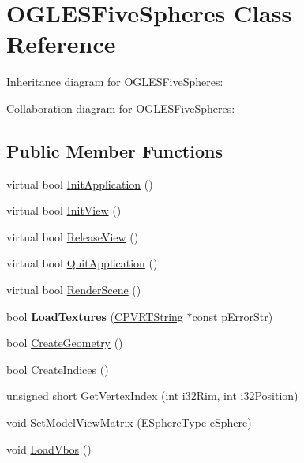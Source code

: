 \hypertarget{class_o_g_l_e_s_five_spheres}{\section{O\+G\+L\+E\+S\+Five\+Spheres Class Reference}
\label{class_o_g_l_e_s_five_spheres}
}


Inheritance diagram for O\+G\+L\+E\+S\+Five\+Spheres\+:


Collaboration diagram for O\+G\+L\+E\+S\+Five\+Spheres\+:
\subsection*{Public Member Functions}
\begin{DoxyCompactItemize}
\item 
virtual bool \hyperlink{class_o_g_l_e_s_five_spheres_a0e55cf988c50d8e740ba341b7a1fe708}{Init\+Application} ()
\item 
virtual bool \hyperlink{class_o_g_l_e_s_five_spheres_a2b29d9ef3de85a5715d04ffd2649dcc9}{Init\+View} ()
\item 
virtual bool \hyperlink{class_o_g_l_e_s_five_spheres_a6c4b60fa419fa9c61d302d41f66f89fe}{Release\+View} ()
\item 
virtual bool \hyperlink{class_o_g_l_e_s_five_spheres_a87bb4d9c4f9173ebecffbee0efdcd50e}{Quit\+Application} ()
\item 
virtual bool \hyperlink{class_o_g_l_e_s_five_spheres_a761c8fd86d8f50a0bfaf4b780031662d}{Render\+Scene} ()
\item 
\hypertarget{class_o_g_l_e_s_five_spheres_a9d7ee0ff05f9c80d5378d508dd79ed0f}{bool {\bfseries Load\+Textures} (\hyperlink{class_c_p_v_r_t_string}{C\+P\+V\+R\+T\+String} $\ast$const p\+Error\+Str)}\label{class_o_g_l_e_s_five_spheres_a9d7ee0ff05f9c80d5378d508dd79ed0f}

\item 
bool \hyperlink{class_o_g_l_e_s_five_spheres_a0f24b7aaca535643c9a5b7e060ab99d8}{Create\+Geometry} ()
\item 
bool \hyperlink{class_o_g_l_e_s_five_spheres_ad8851bcd5f7af66ba348b946fece874e}{Create\+Indices} ()
\item 
unsigned short \hyperlink{class_o_g_l_e_s_five_spheres_a9ae1a2b80fd9cb72ddf8c8cd5d361804}{Get\+Vertex\+Index} (int i32\+Rim, int i32\+Position)
\item 
void \hyperlink{class_o_g_l_e_s_five_spheres_a9ddb3fb9d17a37d18f2fe871cd2346d5}{Set\+Model\+View\+Matrix} (E\+Sphere\+Type e\+Sphere)
\item 
void \hyperlink{class_o_g_l_e_s_five_spheres_adb7db657eac2d928cd63c8b725f47a71}{Load\+Vbos} ()
\end{DoxyCompactItemize}


